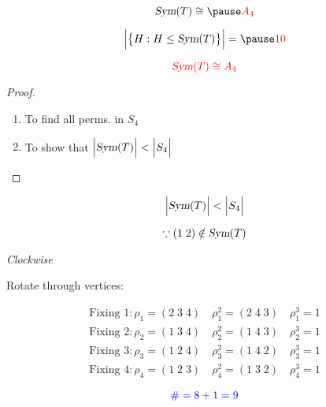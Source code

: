 
\begin{frame}

  \[
	\sym(T) \cong \pause \red{A_4}
  \]

  \pause
  \vspace{-0.30cm}
  \[
	\Big\lvert \big\{H: H \le \sym(T)\big\} \Big\rvert = \pause \red{10}
  \]
\end{frame}

\begin{frame}

  \[
	\textcolor{red}{\textsl{Sym}(T) \cong A_4}
  \]

  \pause
  \begin{proof}
	\begin{enumerate}[(1)]
		\centering
	  \item To find all  perms. in $S_4$ 
		\pause
	  \item To show that $\Big\lvert \textsl{Sym}(T) \Big\rvert < \Big\lvert S_4 \Big\rvert$
	\end{enumerate}
  \end{proof}
\end{frame}

\begin{frame}

  \[
	\Big\lvert \textsl{Sym}(T) \Big\rvert < \Big\lvert S_4 \Big\rvert
  \]

  \pause
  \[
	\because (1\; 2) \notin \textsl{Sym}(T)
  \]
\end{frame}

\begin{frame}
  \vspace{-1.00cm}
  \begin{center}
	{\it Clockwise}
  \end{center}
\end{frame}

\begin{frame}
  \begin{center}
	Rotate through vertices:
  \end{center}

  \begin{align*}
	\text{Fixing } 1: \rho_{1} = (2\; 3\; 4)\quad \rho_{1}^{2} = (2\; 4\; 3)\quad \rho_{1}^{3} = 1 \\[6pt]
	\text{Fixing } 2: \rho_{2} = (1\; 3\; 4)\quad \rho_{2}^{2} = (1\; 4\; 3)\quad \rho_{2}^{3} = 1 \\[6pt]
	\text{Fixing } 3: \rho_{3} = (1\; 2\; 4)\quad \rho_{3}^{2} = (1\; 4\; 2)\quad \rho_{3}^{3} = 1 \\[6pt]
	\text{Fixing } 4: \rho_{4} = (1\; 2\; 3)\quad \rho_{4}^{2} = (1\; 3\; 2)\quad \rho_{4}^{3} = 1
  \end{align*}

  \pause
  \[
	\textcolor{blue}{\# = 8 + 1 = 9}
  \]
\end{frame}

